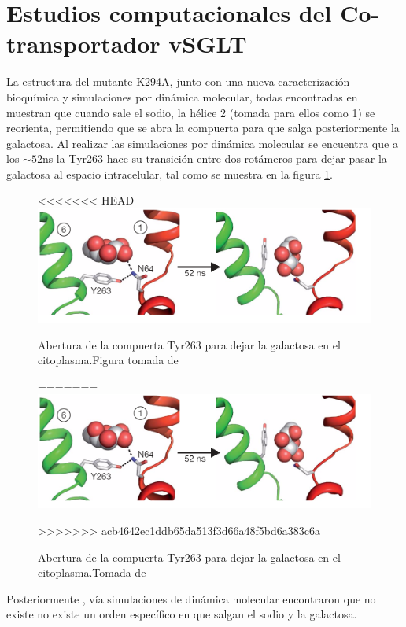 \section{Estudios computacionales del Co-transportador vSGLT}
La estructura del mutante K294A, junto con una nueva caracterizaci\'{o}n bioqu\'{i}mica y simulaciones por din\'{a}mica molecular, todas encontradas en \cite{Watanabe2010} muestran que cuando sale el sodio, la h\'{e}lice 2 (tomada para ellos como 1) se reorienta, permitiendo que se abra la compuerta para que salga posteriormente la galactosa. Al realizar las simulaciones por din\'{a}mica molecular se encuentra que a los $\sim 52$ns la Tyr263 hace su transici\'{o}n entre dos rot\'{a}meros para dejar pasar la galactosa al espacio intracelular,  tal como se muestra en la figura \ref{fig:Y263}.\\
\begin{figure}[ht]
\centering%
<<<<<<< HEAD
\includegraphics[scale=0.5]{Kap3/Y263.png}%
\caption{Abertura de la compuerta Tyr263 para dejar la galactosa en el citoplasma.Figura tomada de \cite{Watanabe2010}} \label{fig:Y263}
=======
\includegraphics[scale=0.4]{Kap3/Y263.png}%
\caption{Abertura de la compuerta Tyr263 para dejar la galactosa en el citoplasma.Tomada de \cite{Watanabe2010}} \label{fig:Y263}
>>>>>>> acb4642ec1ddb65da513f3d66a48f5bd6a383c6a
\end{figure}
Posteriormente \cite{Adelman2016}, v\'{i}a simulaciones de din\'{a}mica molecular  encontraron que no existe no existe un orden espec\'{i}fico en que salgan el sodio y la galactosa.